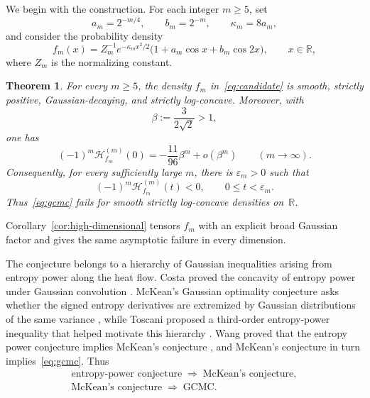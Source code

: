 \documentclass[10pt,letterpaper,journal]{IEEEtran}
\newcommand{\R}{\mathbb{R}}
\newcommand{\cH}{\mathcal{H}}
\theoremstyle{plain}
\newtheorem{theorem}{Theorem}
\theoremstyle{definition}
\begin{document}
We begin with the construction.  For each integer $m\ge5$, set
\begin{equation}
 a_m=2^{-m/4},\qquad b_m=2^{-m},\qquad \kappa_m=8a_m,
 \label{eq:parameters}
\end{equation}
and consider the probability density
\begin{equation}
 f_m(x)=Z_m^{-1}e^{-\kappa_mx^2/2}
 \bigl(1+a_m\cos x+b_m\cos2x\bigr),
 \qquad x\in\R,
 \label{eq:candidate}
\end{equation}
where $Z_m$ is the normalizing constant.

\begin{theorem}
\label{thm:main}
For every $m\ge5$, the density $f_m$ in~\eqref{eq:candidate} is smooth,
strictly positive, Gaussian-decaying, and strictly log-concave. Moreover,
with
\begin{equation}
 \beta:=\frac{3}{2\sqrt2}>1,
 \label{eq:beta}
\end{equation}
one has
\begin{equation}
 (-1)^m\cH_{f_m}^{(m)}(0)
 =-\frac{11}{96}\beta^m+o(\beta^m)
 \qquad (m\to\infty).
 \label{eq:main-asymptotic}
\end{equation}
Consequently, for every sufficiently large $m$, there is
$\varepsilon_m>0$ such that
\begin{equation}
 (-1)^m\cH_{f_m}^{(m)}(t)<0,
 \qquad 0\le t<\varepsilon_m.
 \label{eq:positive-time-failure}
\end{equation}
Thus~\eqref{eq:gcmc} fails for smooth strictly log-concave densities on~$\R$.
\end{theorem}

Corollary~\ref{cor:high-dimensional} tensors $f_m$ with an explicit broad
Gaussian factor and gives the same asymptotic failure in every dimension.

The conjecture belongs to a hierarchy of Gaussian inequalities arising from
entropy power along the heat flow. Costa proved the concavity of entropy power
under Gaussian convolution \cite{Costa1985,Villani2000}. McKean's Gaussian
optimality conjecture asks whether the signed entropy derivatives are
extremized by Gaussian distributions of the same variance
\cite{McKean1966}, while Toscani proposed a third-order entropy-power inequality
that helped motivate this hierarchy \cite{Toscani2015}.
Wang proved that the entropy power conjecture implies McKean's conjecture
\cite{Wang2024Implication}, and McKean's conjecture in turn
implies~\eqref{eq:gcmc}. Thus
\[
 \begin{gathered}
  \text{entropy-power conjecture}
  \;\Longrightarrow\; \text{McKean's conjecture},\\[-0.2ex]
  \text{McKean's conjecture}
  \;\Longrightarrow\; \text{GCMC}.
 \end{gathered}
\]
\end{document}
